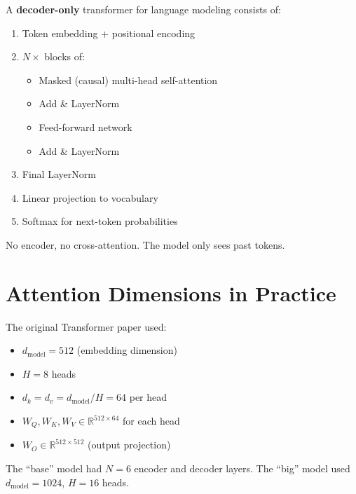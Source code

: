 \begin{definition}
    A \textbf{decoder-only} transformer for language modeling consists of:
    \begin{enumerate}
        \item Token embedding + positional encoding
        \item $N \times$ blocks of:
        \begin{itemize}
            \item Masked (causal) multi-head self-attention
            \item Add \& LayerNorm
            \item Feed-forward network
            \item Add \& LayerNorm
        \end{itemize}
        \item Final LayerNorm
        \item Linear projection to vocabulary
        \item Softmax for next-token probabilities
    \end{enumerate}

    No encoder, no cross-attention. The model only sees past tokens.
\end{definition}

\section{Attention Dimensions in Practice}

\begin{remark}
    The original Transformer paper used:
    \begin{itemize}
        \item $d_{\text{model}} = 512$ (embedding dimension)
        \item $H = 8$ heads
        \item $d_k = d_v = d_{\text{model}} / H = 64$ per head
        \item $W_Q, W_K, W_V \in \mathbb{R}^{512 \times 64}$ for each head
        \item $W_O \in \mathbb{R}^{512 \times 512}$ (output projection)
    \end{itemize}

    The ``base'' model had $N = 6$ encoder and decoder layers. The ``big'' model used $d_{\text{model}} = 1024$, $H = 16$ heads.
\end{remark}

